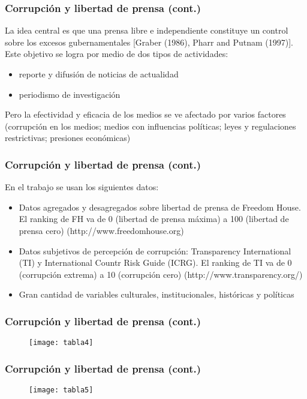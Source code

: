 \documentclass[handout,final,xcolor=dvipsnames]{beamer}
\begin{document}
\begin{frame}\frametitle{Corrupción y libertad de prensa (cont.)}
La idea central es que una prensa libre e independiente constituye un control sobre los excesos gubernamentales [Graber (1986), Pharr and Putnam (1997)]. \\ \medskip 
Este objetivo se logra por medio de dos tipos de actividades: \medskip 
\begin{itemize} \itemsep 15pt
\item reporte y difusión de noticias de actualidad
\item periodismo de investigación
\end{itemize}\medskip 
Pero la efectividad y eficacia de los medios se ve afectado por varios factores (corrupción en los medios; medios con influencias políticas; leyes y regulaciones restrictivas; presiones económicas)
\end{frame}



\begin{frame}\frametitle{Corrupción y libertad de prensa (cont.)}
En el trabajo se usan los siguientes datos: \medskip 
\begin{itemize}\itemsep 10pt
\item Datos agregados y desagregados sobre libertad de prensa de Freedom House. El ranking de FH va de 0 (libertad de prensa máxima) a 100 (libertad de prensa cero)
(http://www.freedomhouse.org)
\item Datos subjetivos de percepción de corrupción: Transparency International (TI) y International Countr Risk Guide (ICRG). El ranking de TI va de 0 (corrupción extrema)
a 10 (corrupción cero) (http://www.transparency.org/)
\item Gran cantidad de variables culturales, institucionales, históricas y políticas
\end{itemize}
\end{frame}


\begin{frame}\frametitle{Corrupción y libertad de prensa (cont.)}
\begin{figure}[htbp]
    \centering
    \texttt{[image: tabla4]}
 \end{figure}
\end{frame}



\begin{frame}\frametitle{Corrupción y libertad de prensa (cont.)}
\begin{figure}[htbp]
    \centering
    \texttt{[image: tabla5]}
 \end{figure}
\end{frame}
\end{document}
